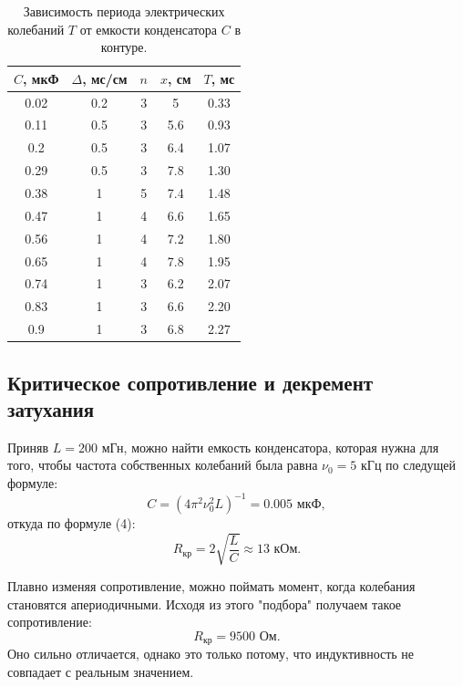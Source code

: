 \documentclass[a4paper, 14pt]{extarticle}%
\newcommand\ECaption[1]{%
     \captionsetup{font=footnotesize}%
     \caption{#1}}
\begin{document}
\begin{table}[h!]
\begin{center}
\begin{tabular}{|c|c|c|c|c|}
\hline
\rowcolor[HTML]{9698ED} 
$C$, мкФ   & $\Delta$, мс/см & $n$ & $x$, см   & $T$, мс    \\ \hline
0.02 & 0.2    & 3 & 5   & 0.33 \\ \hline
\rowcolor[HTML]{9698ED} 
0.11 & 0.5    & 3 & 5.6 & 0.93 \\ \hline
0.2  & 0.5    & 3 & 6.4 & 1.07 \\ \hline
\rowcolor[HTML]{9698ED} 
0.29 & 0.5    & 3 & 7.8 & 1.30 \\ \hline
0.38 & 1      & 5 & 7.4 & 1.48 \\ \hline
\rowcolor[HTML]{9698ED} 
0.47 & 1      & 4 & 6.6 & 1.65 \\ \hline
0.56 & 1      & 4 & 7.2 & 1.80 \\ \hline
\rowcolor[HTML]{9698ED} 
0.65 & 1      & 4 & 7.8 & 1.95 \\ \hline
0.74 & 1      & 3 & 6.2 & 2.07 \\ \hline
\rowcolor[HTML]{9698ED} 
0.83 & 1      & 3 & 6.6 & 2.20 \\ \hline
0.9  & 1      & 3 & 6.8 & 2.27 \\ \hline
\end{tabular}
\ECaption{Зависимость периода электрических колебаний $T$ от емкости конденсатора $C$ в контуре.}
\end{center}
\end{table}

\subsection*{Критическое сопротивление и декремент затухания}

Приняв $L=200$ мГн, можно найти емкость конденсатора, которая нужна для того, чтобы частота собственных колебаний была равна $\nu_0=5$ кГц по следущей формуле:
\[C = (4\pi^2\nu^2_0L)^{-1} = 0.005 \text{ мкФ},\]
откуда по формуле (4):
\begin{equation}
R_{\text{кр}} = 2\sqrt{\frac{L}{C}} \approx 13 \text{ кОм}.
\end{equation}

Плавно изменяя сопротивление, можно поймать момент, когда колебания становятся апериодичными. Исходя из этого "подбора" получаем такое сопротивление:
\[R_{\text{кр}} = 9500\text{ Ом}.\] 
Оно сильно отличается, однако это только потому, что индуктивность не совпадает с реальным значением.
\end{document}
